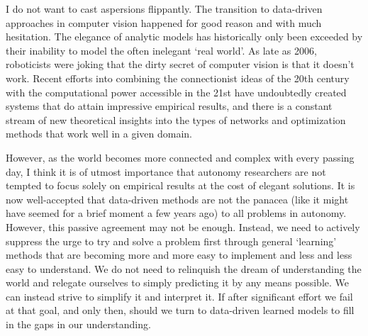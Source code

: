 I do not want to cast aspersions flippantly.  The transition to data-driven approaches in computer vision happened for good reason and with much hesitation. The elegance of analytic models has historically only been exceeded by their inability to model the often inelegant `real world'. As late as 2006, roboticists were joking that the dirty secret of computer vision is that it doesn't work. Recent efforts into combining the connectionist ideas of the 20th century with the computational power accessible in the 21st have undoubtedly created systems that do attain impressive empirical results, and there is a constant stream of new theoretical insights into the types of networks and optimization methods that work well in a given domain.

However, as the world becomes more connected and complex with every passing day, I think it is of utmost importance that autonomy researchers are not tempted to focus solely on empirical results at the cost of elegant solutions. It is now well-accepted that data-driven methods are not the panacea (like it might have seemed for a brief moment a few years ago) to all problems in autonomy. However, this passive agreement may not be enough. Instead, we need to actively suppress the urge to try and solve a problem first through general `learning' methods that are becoming more and more easy to implement and less and less easy to understand.  We do not need to relinquish the dream of understanding the world and relegate ourselves to simply predicting it by any means possible. We can instead strive to simplify it and interpret it. If after significant effort we fail at that goal, and only then, should we turn to data-driven learned models to fill in the gaps in our understanding.

